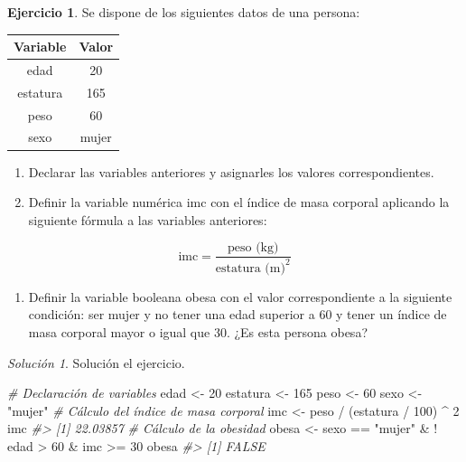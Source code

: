 \documentclass[
]{book}
\newenvironment{Shaded}{\begin{snugshade}}{\end{snugshade}}
\newcommand{\CommentTok}[1]{\textcolor[rgb]{0.56,0.35,0.01}{\textit{#1}}}
\newcommand{\DecValTok}[1]{\textcolor[rgb]{0.00,0.00,0.81}{#1}}
\newcommand{\NormalTok}[1]{#1}
\newcommand{\OtherTok}[1]{\textcolor[rgb]{0.56,0.35,0.01}{#1}}
\newcommand{\SpecialCharTok}[1]{\textcolor[rgb]{0.00,0.00,0.00}{#1}}
\newcommand{\StringTok}[1]{\textcolor[rgb]{0.31,0.60,0.02}{#1}}
\providecommand{\tightlist}{%
  \setlength{\itemsep}{0pt}\setlength{\parskip}{0pt}}
\theoremstyle{definition}
\theoremstyle{definition}
\theoremstyle{definition}
\newtheorem{exercise}{Ejercicio}[chapter]
\theoremstyle{definition}
\theoremstyle{remark}
\newtheorem*{solution}{Solución}
\begin{document}
\begin{exercise}

Se dispone de los siguientes datos de una persona:

\begin{longtable}[]{@{}cc@{}}
\toprule
Variable & Valor \\
\midrule
\endhead
edad & 20 \\
estatura & 165 \\
peso & 60 \\
sexo & mujer \\
\bottomrule
\end{longtable}

\begin{enumerate}
\def\labelenumi{\arabic{enumi}.}
\item
  Declarar las variables anteriores y asignarles los valores correspondientes.
\item
  Definir la variable numérica imc con el índice de masa corporal aplicando la siguiente fórmula a las variables anteriores:
\end{enumerate}

\[\mbox{imc} = \frac{\mbox{peso (kg)}}{\mbox{estatura (m)}^2}\]

\begin{enumerate}
\def\labelenumi{\arabic{enumi}.}
\setcounter{enumi}{2}
\tightlist
\item
  Definir la variable booleana obesa con el valor correspondiente a la siguiente condición: ser mujer y no tener una edad superior a 60 y tener un índice de masa corporal mayor o igual que 30. ¿Es esta persona obesa?
\end{enumerate}

\end{exercise}

\begin{solution}

Solución el ejercicio.

\begin{Shaded}
\begin{Highlighting}[]
\CommentTok{\# Declaración de variables}
\NormalTok{edad }\OtherTok{\textless{}{-}} \DecValTok{20}
\NormalTok{estatura }\OtherTok{\textless{}{-}} \DecValTok{165}
\NormalTok{peso }\OtherTok{\textless{}{-}} \DecValTok{60}
\NormalTok{sexo }\OtherTok{\textless{}{-}} \StringTok{"mujer"}
\CommentTok{\# Cálculo del índice de masa corporal}
\NormalTok{imc }\OtherTok{\textless{}{-}}\NormalTok{ peso }\SpecialCharTok{/}\NormalTok{ (estatura }\SpecialCharTok{/} \DecValTok{100}\NormalTok{) }\SpecialCharTok{\^{}} \DecValTok{2}
\NormalTok{imc}
\CommentTok{\#\textgreater{} [1] 22.03857}
\CommentTok{\# Cálculo de la obesidad}
\NormalTok{obesa }\OtherTok{\textless{}{-}}\NormalTok{ sexo }\SpecialCharTok{==} \StringTok{"mujer"} \SpecialCharTok{\&} \SpecialCharTok{!}\NormalTok{ edad }\SpecialCharTok{\textgreater{}} \DecValTok{60} \SpecialCharTok{\&}\NormalTok{ imc }\SpecialCharTok{\textgreater{}=} \DecValTok{30}
\NormalTok{obesa}
\CommentTok{\#\textgreater{} [1] FALSE}
\end{Highlighting}
\end{Shaded}

\end{solution}
\end{document}
